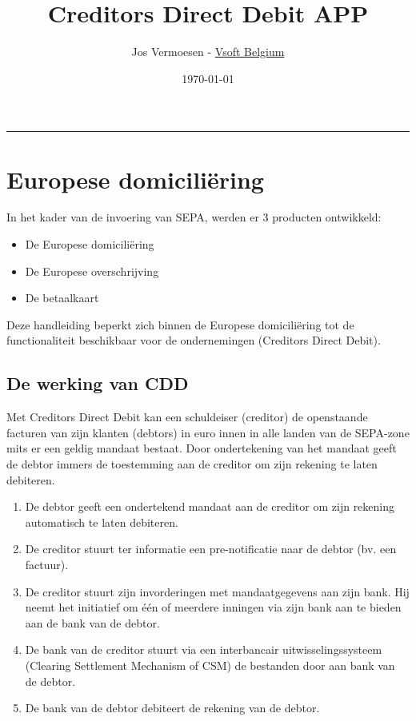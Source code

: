 \documentclass[11pt, a4paper]{article}
\title{\vskip-2.5cm Creditors Direct Debit APP\vskip-5mm}
\author{
  Jos Vermoesen -
  \href{https://vsoft.be}{Vsoft Belgium}}
\date{\today}
\begin{document}
\maketitle\hrule

\tableofcontents

\section{Europese domiciliëring}
  \label{sec:intro}
  In het kader van de invoering van SEPA, werden er 3 producten ontwikkeld:

  \begin{itemize}
    \item
      De Europese domiciliëring
    \item
    De Europese overschrijving
    \item
    De betaalkaart
  \end{itemize}
  Deze handleiding beperkt zich binnen de Europese domiciliëring tot de
  functionaliteit beschikbaar voor de ondernemingen (Creditors Direct
  Debit).

  \subsection{De werking van CDD}\label{sec:howto}
  Met Creditors Direct Debit kan een schuldeiser (creditor) de openstaande
  facturen van zijn klanten (debtors) in euro innen in alle landen van de
  SEPA-zone mits er een geldig mandaat bestaat. Door ondertekening van het
  mandaat geeft de debtor immers de toestemming aan de creditor om zijn
  rekening te laten debiteren. 

  \begin{enumerate}
    \item
    De debtor geeft een ondertekend mandaat aan de creditor om zijn rekening
    automatisch te laten debiteren.
    \item
    De creditor stuurt ter informatie een pre-notificatie naar de debtor
    (bv. een factuur).
    \item
    De creditor stuurt zijn invorderingen met mandaatgegevens aan zijn bank.
    Hij neemt het initiatief om één of meerdere inningen via zijn bank aan
    te bieden aan de bank van de debtor.
    \item
    De bank van de creditor stuurt via een interbancair uitwisselingssysteem
    (Clearing Settlement Mechanism of CSM) de bestanden door aan bank van de
    debtor.
    \item
    De bank van de debtor debiteert de rekening van de debtor.
  \end{enumerate}
\end{document}
